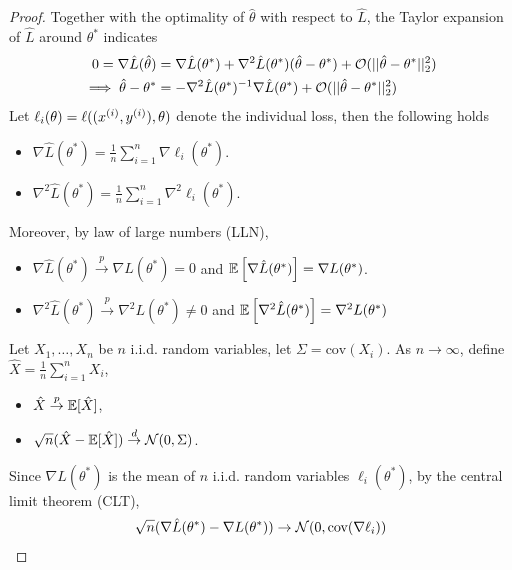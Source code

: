 \documentclass[11pt]{article}
\newcommand{\thetahat}[0]{\hat{\theta}}
\newcommand{\convp}[0]{\overset{p}{\rightarrow}}
\newcommand{\convd}[0]{\overset{d}{\rightarrow}}
\newcommand{\inv}[0]{^{-1}}
\newcommand{\cov}[0]{\text{cov}}
\begin{document}
	\begin{proof}
		Together with the optimality of $\thetahat$ with respect to $\hat{L}$, the Taylor expansion of $\hat{L}$ around $\theta^*$ indicates
		\begin{align}
			0 = \nabla \hat{L}(\thetahat) &= \nabla \hat{L}(\theta^*) + \nabla^2 \hat{L}(\theta^*) (\thetahat - \theta^*) + \mc{O}(\norm{\thetahat - \theta^*}_2^2) \\
			\implies
			\thetahat - \theta^* &= - \nabla^2 \hat{L}(\theta^*)\inv \nabla \hat{L}(\theta^*) + \mc{O}(\norm{\thetahat - \theta^*}_2^2)
		\end{align}
		Let $\ell_i(\theta) = \ell((x^{(i)}, y^{(i)}), \theta)$ denote the individual loss, then the following holds
		\begin{itemize}
			\item $\nabla \hat{L}(\theta^*) = \frac{1}{n} \sum_{i=1}^n \nabla \ell_i(\theta^*)$.
			\item $\nabla^2 \hat{L}(\theta^*) = \frac{1}{n} \sum_{i=1}^n \nabla^2 \ell_i(\theta^*)$.
		\end{itemize}
		Moreover, by law of large numbers (LLN),
		\begin{itemize}
			\item $\nabla \hat{L}(\theta^*) \convp \nabla L(\theta^*) = 0$ and $\mathbb{E}\left[{\nabla \hat{L}(\theta^*)}\right] = \nabla L(\theta^*)$.
			\item $\nabla^2 \hat{L}(\theta^*) \convp \nabla^2 L(\theta^*) \neq 0$ and $\mathbb{E}\left[{\nabla^2 \hat{L}(\theta^*)}\right] = \nabla^2 L(\theta^*)$
		\end{itemize}
		\begin{tcolorbox}
			\begin{theorem}
				Let $X_1, \dots, X_n$ be $n$ i.i.d. random variables, let $\Sigma = \cov(X_i)$. As $n \to \infty$, define $\hat{X} = \frac{1}{n}\sum_{i=1}^n X_i$,
				\begin{itemize}
					\item $\hat{X} \convp \expe[\hat{X}]$,
					\item $\sqrt{n} (\hat{X} - \expe[\hat{X}]) \convd \mc{N}(0, \Sigma)$.
				\end{itemize}
			\end{theorem}
		\end{tcolorbox}
		Since $\nabla \hat{L}(\theta^*)$ is the mean of $n$ i.i.d. random variables $\ell_i(\theta^*)$, by the central limit theorem (CLT),
		\begin{align}
			\sqrt{n}(\nabla \hat{L}(\theta^*) - \nabla L(\theta^*)) &\to \mc{N}(0, \cov(\nabla \ell_i)) \\

\end{align}
\end{proof}
\end{document}

